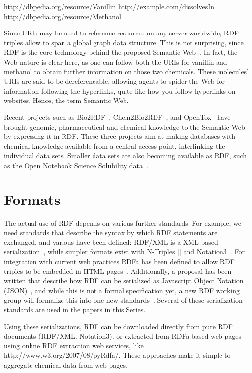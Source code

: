 \documentclass[10pt]{bmc_article}
\newenvironment{bmcformat}{\begin{raggedright}\baselineskip20pt\sloppy\setboolean{publ}{false}}{\end{raggedright}\baselineskip20pt\sloppy}
\begin{document}
\begin{bmcformat}
http://dbpedia.org/resource/Vanillin http://example.com/dissolvesIn http://dbpedia.org/resource/Methanol

Since URIs may be used to reference resources on any server worldwide, RDF triples allow to span a global graph data structure. 
This is not surprising, since RDF is the core technology behind the proposed Semantic Web~\cite{BER2001}. In fact, the Web
nature is clear here, as one can follow both the URIs for vanillin and methanol to
obtain further information on those two chemicals. These molecules' URIs are said to be
dereferencable, allowing agents to spider the Web for information following
the hyperlinks, quite like how you follow hyperlinks on websites. Hence, the term Semantic Web.

Recent projects such as Bio2RDF~\cite{BEL2008}, Chem2Bio2RDF~\cite{CHE2010},
and OpenTox~\cite{Hardy2010} have brought genomic, pharmaceutical and
chemical knowledge to the Semantic Web by expressing it in RDF.
These three projects aim at making databases with chemical knowledge
available from a central access point, interlinking the individual
data sets. Smaller data sets are also becoming available as RDF, such as
the Open Notebook Science Solubility data~\cite{citeulike:5441072}. 

\section{Formats}

The actual use of RDF depends on various further standards. For example, we need
standards that describe the syntax by which RDF statements are exchanged, and
various have been defined: RDF/XML is a XML-based serialization~\cite{Beckett2004}, while
simpler formats exist with N-Triples [] and Notation3~\cite{BernersLee2006}. For integration with
current web practices RDFa has been defined to allow RDF triples to be embedded
in HTML pages~\cite{RDFA2008}. Additionally, a proposal has been written that
describe how RDF can be serialized as Javascript Object Notation (JSON)~\cite{Alexander2008}, and
while this is not a formal specification yet,
a new RDF working group will formalize this into one new standards~\cite{Herman2010}. Several
of these serialization standards are used in the papers in this Series.

Using these serializations, RDF can be downloaded directly from pure RDF
documents (RDF/XML, Notation3), or extracted from RDFa-based web pages using
online RDF extraction web services, like http://www.w3.org/2007/08/pyRdfa/.
These approaches make it simple to aggregate chemical data from web pages.


\end{bmcformat}
\end{document}

